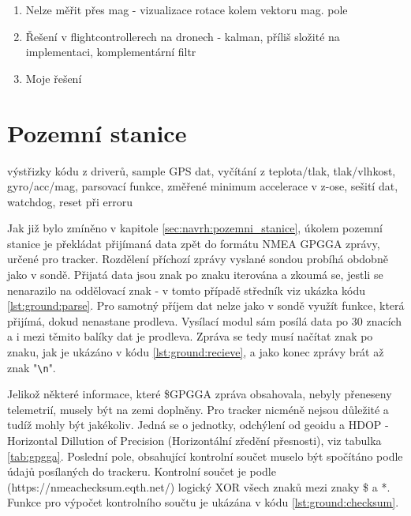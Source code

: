 \documentclass[twoside]{ctuthesis}
\theoremstyle{plain}
\theoremstyle{definition}
\theoremstyle{note}
\begin{document}
	
	

	\begin{enumerate}
		\item Nelze měřit přes mag - vizualizace rotace kolem vektoru mag. pole
		\item Řešení v flightcontrollerech na dronech - kalman, příliš složité na implementaci, komplementární filtr
		\item Moje řešení
	\end{enumerate}
	









	

	







	\section{Pozemní stanice}
	výstřizky kódu z driverů, sample GPS dat, vyčítání z teplota/tlak, tlak/vlhkost, gyro/acc/mag, parsovací funkce, změřené minimum accelerace v z-ose, sešití dat, watchdog, reset při erroru

	Jak již bylo zmíněno v kapitole \ref{sec:navrh:pozemni_stanice}, úkolem pozemní stanice je překládat přijímaná data zpět do formátu NMEA GPGGA zprávy, určené pro tracker. Rozdělení příchozí zprávy vyslané sondou probíhá obdobně jako v sondě. Přijatá data jsou znak po znaku iterována a zkoumá se, jestli se nenarazilo na oddělovací znak - v tomto případě středník viz ukázka kódu \ref{lst:ground:parse}. Pro samotný příjem dat nelze jako v sondě využít funkce, která přijímá, dokud nenastane prodleva. Vysílací modul sám posílá data po 30 znacích a i mezi těmito balíky dat je prodleva. Zpráva se tedy musí načítat znak po znaku, jak je ukázáno v kódu \ref{lst:ground:recieve}, a jako konec zprávy brát až znak "\lstinline |\n|".

	

	

	Jelikož některé informace, které \$GPGGA zpráva obsahovala, nebyly přeneseny telemetrií, musely být na zemi doplněny. Pro tracker nicméně nejsou důležité a tudíž mohly být jakékoliv. Jedná se o jednotky, odchýlení od geoidu a HDOP - Horizontal Dillution of Precision (Horizontální zředění přesnosti), viz tabulka \ref{tab:gpgga}. Poslední pole, obsahující kontrolní součet muselo být spočítáno podle údajů posílaných do trackeru. Kontrolní součet je podle (https://nmeachecksum.eqth.net/) logický XOR všech znaků mezi znaky \$ a *. Funkce pro výpočet kontrolního součtu je ukázána v kódu \ref{lst:ground:checksum}.
\end{document}
